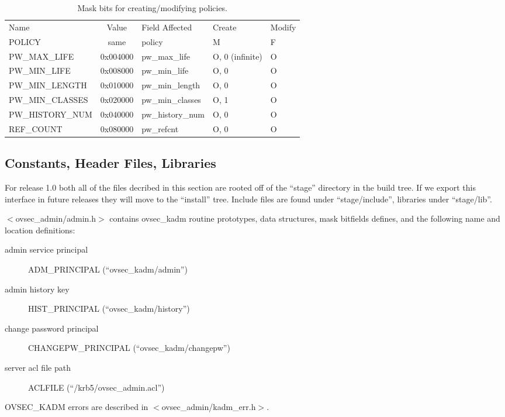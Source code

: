 \begin{table}[htbp]
\begin{tabular}{@{}lclll}
Name & Value & Field Affected & Create & Modify \\
POLICY                  & same     & policy & M & F \\
PW_MAX_LIFE             & 0x004000 & pw_max_life & O, 0 (infinite) & O \\
PW_MIN_LIFE             & 0x008000 & pw_min_life & O, 0 & O \\
PW_MIN_LENGTH           & 0x010000 & pw_min_length & O, 0 & O \\
PW_MIN_CLASSES          & 0x020000 & pw_min_classes & O, 1 & O \\
PW_HISTORY_NUM          & 0x040000 & pw_history_num & O, 0 & O \\
REF_COUNT               & 0x080000 & pw_refcnt & O, 0 & O 
\end{tabular}
\caption{Mask bits for creating/modifying policies.}
\label{tab:policy-bits}
\end{table}

\subsection{Constants, Header Files, Libraries}

For release 1.0 both all of the files decribed in this section are
rooted off of the ``stage'' directory in the build tree.  If we export
this interface in future releases they will move to the ``install''
tree. Include files are found under ``stage/include'', libraries under
``stage/lib''.

$<$ovsec_admin/admin.h$>$ contains ovsec_kadm routine prototypes, data
structures, mask bitfields defines, and the following name and
location definitions:

\begin{description}
\item[admin service principal] ADM_PRINCIPAL (``ovsec_kadm/admin'')
\item[admin history key] HIST_PRINCIPAL (``ovsec_kadm/history'')
\item[change password principal] CHANGEPW_PRINCIPAL (``ovsec_kadm/changepw'')
\item[server acl file path] ACLFILE (``/krb5/ovsec_admin.acl'')
\end{description}

OVSEC_KADM errors are described in $<$ovsec_admin/kadm_err.h$>$.

